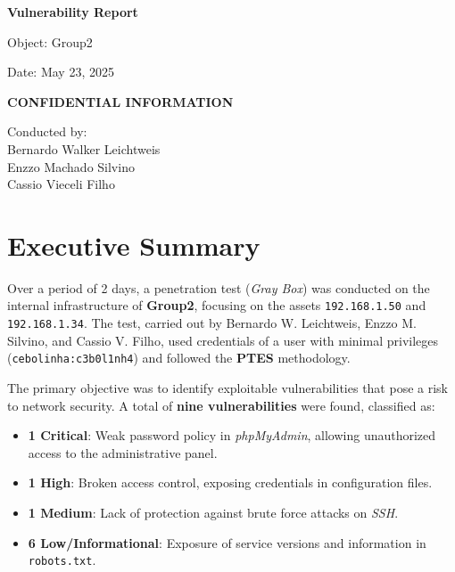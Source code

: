 \documentclass[a4paper,12pt]{article}
\begin{document}
\pagestyle{fancy}


\begin{titlepage}
    \centering
    \vspace*{2cm}
    {\Huge\bfseries Vulnerability Report\par}
    \vspace{1cm}
    {\Large Object: Group2\par}
    {\Large Date: May 23, 2025\par}
    \vspace{0.5cm}
    {\large\bfseries CONFIDENTIAL INFORMATION\par}
    \vspace{2cm}
    {\large Conducted by: \\ Bernardo Walker Leichtweis \\ Enzzo Machado Silvino \\ Cassio Vieceli Filho\par}
\end{titlepage}

\tableofcontents
\clearpage

\section{Executive Summary}
Over a period of 2 days, a penetration test (\textit{Gray Box}) was conducted on the internal infrastructure of \textbf{Group2}, focusing on the assets \texttt{192.168.1.50} and \texttt{192.168.1.34}. The test, carried out by Bernardo W. Leichtweis, Enzzo M. Silvino, and Cassio V. Filho, used credentials of a user with minimal privileges (\texttt{cebolinha:c3b0l1nh4}) and followed the \textbf{PTES} methodology.

The primary objective was to identify exploitable vulnerabilities that pose a risk to network security. A total of \textbf{nine vulnerabilities} were found, classified as:
\begin{itemize}
    \item \textbf{1 Critical}: Weak password policy in \textit{phpMyAdmin}, allowing unauthorized access to the administrative panel.
    \item \textbf{1 High}: Broken access control, exposing credentials in configuration files.
    \item \textbf{1 Medium}: Lack of protection against brute force attacks on \textit{SSH}.
    \item \textbf{6 Low/Informational}: Exposure of service versions and information in \texttt{robots.txt}.
\end{itemize}
\end{document}
